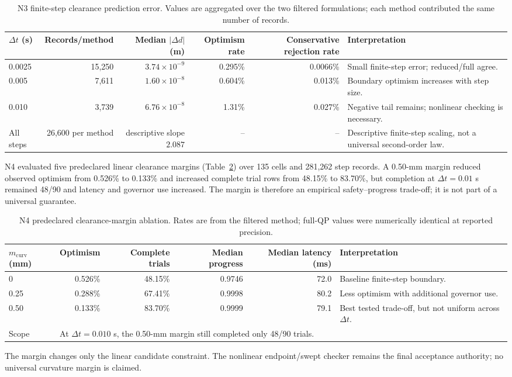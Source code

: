 \documentclass[preprint,12pt]{elsarticle}
\begin{document}
\begin{table}[t]
\centering
\small
\caption{N3 finite-step clearance prediction error. Values are aggregated over the two filtered formulations; each method contributed the same number of records.}
\label{tab:n3_finite_step}
\begin{tabularx}{\textwidth}{@{}lrrrrX@{}}
\toprule
$\Delta t$ (s) & Records/method & Median $|\Delta d|$ (m) & Optimism rate & Conservative rejection rate & Interpretation \\
\midrule
0.0025 & 15,250 & $3.74\times10^{-9}$ & 0.295\% & 0.0066\% & Small finite-step error; reduced/full agree. \\
0.005 & 7,611 & $1.60\times10^{-8}$ & 0.604\% & 0.013\% & Boundary optimism increases with step size. \\
0.010 & 3,739 & $6.76\times10^{-8}$ & 1.31\% & 0.027\% & Negative tail remains; nonlinear checking is necessary. \\
\midrule
All steps & 26,600 per method & descriptive slope $2.087$ & -- & -- & Descriptive finite-step scaling, not a universal second-order law. \\
\bottomrule
\end{tabularx}
\end{table}


N4 evaluated five predeclared linear clearance margins (Table~\ref{tab:n4_margin}) over 135 cells and 281,262 step records. A 0.50-mm margin reduced observed optimism from 0.526\% to 0.133\% and increased complete trial rows from 48.15\% to 83.70\%, but completion at $\Delta t=0.01$ s remained 48/90 and latency and governor use increased. The margin is therefore an empirical safety--progress trade-off; it is not part of a universal guarantee.

\begin{table}[t]
\centering
\small
\caption{N4 predeclared clearance-margin ablation. Rates are from the filtered method; full-QP values were numerically identical at reported precision.}
\label{tab:n4_margin}
\begin{tabularx}{\textwidth}{@{}lrrrrX@{}}
\toprule
$m_{\mathrm{curv}}$ (mm) & Optimism & Complete trials & Median progress & Median latency (ms) & Interpretation \\
\midrule
0 & 0.526\% & 48.15\% & 0.9746 & 72.0 & Baseline finite-step boundary. \\
0.25 & 0.288\% & 67.41\% & 0.9998 & 80.2 & Less optimism with additional governor use. \\
0.50 & 0.133\% & 83.70\% & 0.9999 & 79.1 & Best tested trade-off, but not uniform across $\Delta t$. \\
\midrule
Scope & \multicolumn{5}{l}{At $\Delta t=0.010$ s, the 0.50-mm margin still completed only 48/90 trials.} \\
\bottomrule
\end{tabularx}
\vspace{1mm}
\parbox{0.94\textwidth}{\footnotesize The margin changes only the linear candidate constraint. The nonlinear endpoint/swept checker remains the final acceptance authority; no universal curvature margin is claimed.}
\end{table}
\end{document}
